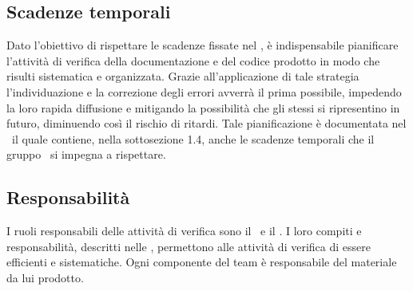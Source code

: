 \documentclass[../PianoDiQualifica.tex]{subfiles}
\begin{document}
		\subsection{Scadenze temporali}
			Dato l'obiettivo di rispettare le scadenze fissate nel \pianodiprogettov, è
			indispensabile pianificare l'attività di verifica della documentazione e del
			codice prodotto in modo che risulti sistematica e organizzata. Grazie
			all'applicazione di tale strategia l'individuazione e la correzione degli
			errori avverrà il prima possibile, impedendo la loro rapida diffusione e
			mitigando la possibilità che gli stessi si ripresentino in futuro,
			diminuendo così il rischio di ritardi. Tale pianificazione è documentata nel
			\pianodiprogettov\ il quale contiene, nella sottosezione 1.4, anche le
			scadenze temporali che il gruppo \kaleidoscode\ si impegna a rispettare.
		\subsection{Responsabilità}
			I ruoli responsabili delle attività di verifica sono il
			\responsabilediprogetto\ e il \verificatore. I loro compiti e
			responsabilità, descritti nelle \normediprogettov, permettono alle attività
			di verifica di essere efficienti e sistematiche.
			Ogni componente del team è responsabile del materiale da lui prodotto.
\end{document}
